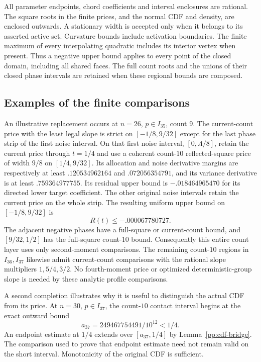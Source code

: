 All parameter endpoints, chord coefficients and interval enclosures
are rational. The square roots in the finite prices, and the
normal CDF and density, are enclosed outwards. A stationary
width is accepted only when it belongs to its asserted active
set. Curvature bounds include activation boundaries. The finite
maximum of every interpolating quadratic includes its interior
vertex when present. Thus a negative upper bound applies to
every point of the closed domain, including all shared faces.
The full count roots and the unions of their closed phase
intervals are retained when these regional bounds are composed.

\subsection{Examples of the finite comparisons}
An illustrative replacement occurs at $n=26$, $p\in I_{35}$,
count $9$. The current-count price with the least legal slope
is strict on $[-1/8,9/32]$ except for the last phase strip of
the first noise interval. On that first noise interval,
$[0,\Lambda/8]$, retain the current price through $t=1/4$ and
use a coherent count-$10$ reflected-square price of width $9/8$
on $[1/4,9/32]$. Its allocation and noise derivative margins
are respectively at least $.120534962164$ and $.072056354791$,
and its variance derivative is at least $.759364977755$.
Its residual upper bound is $-.018464965470$ for its directed
lower target coefficient. The other original noise intervals
retain the current price on the whole strip.
The resulting uniform upper bound on $[-1/8,9/32]$ is
\begin{equation}\label{fc:n26-simple}
 R(t)\le-.000067780727.
\end{equation}
The adjacent negative phases have a full-square or current-count
bound, and $[9/32,1/2]$ has the full-square count-$10$ bound.
Consequently this entire count layer uses only second-moment
comparisons. The remaining count-$10$ regions in $I_{36},I_{37}$
likewise admit current-count comparisons with the rational slope
multipliers $1,5/4,3/2$. No fourth-moment price or optimized
deterministic-group slope is needed by these analytic profile comparisons.

A second completion illustrates why it is useful to distinguish
the actual CDF from its price. At $n=30$, $p\in I_{37}$,
the count-$10$ contact interval begins at the exact outward
bound
\[
 a_{37}=249467754491/10^{12}<1/4.
\]
An endpoint estimate at $1/4$ extends over $[a_{37},1/4]$
by Lemma~\ref{pp:cdf-bridge}. The comparison used to prove that
endpoint estimate need not remain valid on the short interval.
Monotonicity of the original CDF is sufficient.

